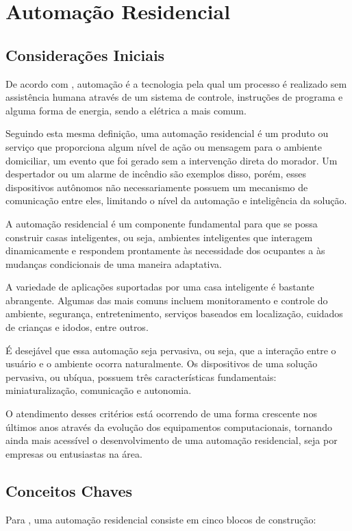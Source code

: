 \chapter {Automação Residencial}
\label{cap:2}

\section {Considerações Iniciais}
De acordo com , automação é a tecnologia pela qual um processo é realizado
sem assistência humana através de um sistema de controle, instruções de programa e alguma forma de energia,
sendo a elétrica a mais comum.

Seguindo esta mesma definição, uma automação residencial é um produto ou serviço que proporciona algum nível de
ação ou mensagem para o ambiente domiciliar, um evento que foi gerado sem a intervenção direta do morador. Um
despertador ou um alarme de incêndio são exemplos disso, porém, esses dispositivos autônomos não
necessariamente possuem um mecanismo de comunicação entre eles, limitando o nível da automação e inteligência
da solução. \cite{riley2012}

A automação residencial é um componente fundamental para que se possa construir casas inteligentes, ou seja,
ambientes inteligentes que interagem dinamicamente e respondem prontamente às necessidade dos ocupantes a às
mudanças condicionais de uma maneira adaptativa. \cite{al-qutayri2010}

A variedade de aplicações suportadas por uma casa inteligente é bastante abrangente. Algumas das mais comuns incluem
monitoramento e controle do ambiente, segurança, entretenimento, serviços baseados em localização, cuidados
de crianças e idodos, entre outros. \cite{al-qutayri2010}

É desejável que essa automação seja pervasiva, ou seja, que a interação entre o usuário e o ambiente ocorra
naturalmente. Os dispositivos de uma solução pervasiva, ou ubíqua, possuem três características fundamentais:
miniaturalização, comunicação e autonomia. \cite{lalanda2010}

O atendimento desses critérios está ocorrendo de uma forma crescente nos últimos anos através da evolução dos
equipamentos computacionais, tornando ainda mais acessível o desenvolvimento de uma automação residencial,
seja por empresas ou entusiastas na área.

\section{Conceitos Chaves}
Para , uma automação residencial consiste em cinco blocos de construção:

